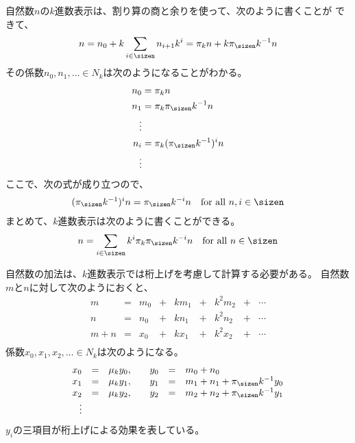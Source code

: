 	自然数$n$の$k$進数表示は、割り算の商と余りを使って、次のように書くことが
	できて、
	\begin{equation*}\begin{split}
		n = n_0 + k\sum_{i\in\sizen}n_{i+1}k^i = \pi_kn + k\q{k}n
	\end{split}\end{equation*}
	その係数$n_0,n_1,\dots\in N_k$は次のようになることがわかる。
	\begin{equation*}\begin{split}
		n_0 &= \pi_kn \\
		n_1 &= \pi_k\q{k}n \\
		\vdots \\
		n_i &= \pi_k(\q{k})^in \\
		\vdots \\
	\end{split}\end{equation*}
	ここで、次の式が成り立つので、
	\begin{equation*}\begin{split}
		(\q{k})^in = \pi_\sizen k^{-i}n
		\quad\text{for all }n,i\in\sizen
	\end{split}\end{equation*}
	まとめて、$k$進数表示は次のように書くことができる。
	\begin{equation}\label{eq:自然数のk進数表示その二}\begin{split}
		n = \sum_{i\in\sizen}k^i\pi_k\pi_\sizen k^{-i}n 
		\quad\text{for all }n\in\sizen
	\end{split}\end{equation}

	自然数の加法は、$k$進数表示では桁上げを考慮して計算する必要がある。
	自然数$m$と$n$に対して次のようにおくと、
	{\setlength\arraycolsep{2pt}
	\begin{equation*}\begin{array}{rclccccccccc}
		m &=& m_0 &+& km_1 &+& k^2m_2 &+& \cdots \\
		n &=& n_0 &+& kn_1 &+& k^2n_2 &+& \cdots \\
		m + n &=& x_0 &+& kx_1 &+& k^2x_2 &+& \cdots \\
	\end{array}\end{equation*}
	}
	係数$x_0,x_1,x_2,\dots\in N_k$は次のようになる。
	{\setlength\arraycolsep{2pt}
	\begin{equation*}\begin{array}{rclrcl}
		x_0 &=& \mu_ky_0,\quad & y_0 &=& m_0 + n_0 \\
		x_1 &=& \mu_ky_1,\quad & y_1 &=& m_1 + n_1 + \pi_\sizen k^{-1}y_0 \\
		x_2 &=& \mu_ky_2,\quad & y_2 &=& m_2 + n_2 + \pi_\sizen k^{-1}y_1 \\
		\vdots \\
	\end{array}\end{equation*}
	}
	$y_i$の三項目が桁上げによる効果を表している。


